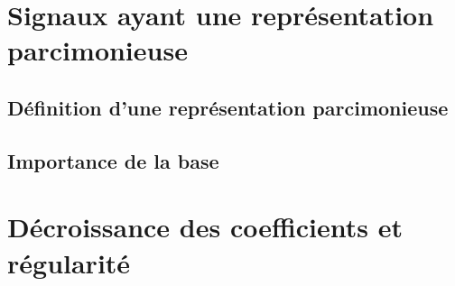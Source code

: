 \section{Signaux ayant une représentation parcimonieuse}
\subsection{Définition d'une représentation parcimonieuse}
\subsection{Importance de la base}

\section{Décroissance des coefficients et régularité}
